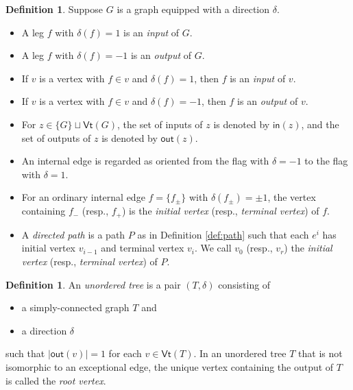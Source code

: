 \documentclass[11pt]{amsbook}
\numberwithin{section}{chapter}
\numberwithin{subsection}{section}
\numberwithin{equation}{section}
\theoremstyle{plain}
\theoremstyle{definition}
\newtheorem{definition}[equation]{Definition}
\newcommand{\Vt}{\mathsf{Vt}}
\newcommand{\inp}{\mathsf{in}}
\newcommand{\out}{\mathsf{out}}
\begin{document}
\begin{definition}\label{def:directed-path} 
Suppose $G$ is a graph equipped with a direction $\delta$.
\begin{itemize} \item A leg $f$ with $\delta(f) = 1$ is an \emph{input} of $G$.
\item A leg $f$ with $\delta(f) = -1$ is an  \emph{output} of $G$.
\item If $v$ is a vertex with $f \in v$ and $\delta(f) = 1$, then $f$ is an \emph{input} of $v$.
\item If $v$ is a vertex with $f \in v$ and $\delta(f) = -1$, then $f$ is an \emph{output} of $v$.
\item For $z \in \{G\} \sqcup \Vt(G)$, the set of inputs of $z$ is denoted by $\inp(z)$, and the set of outputs of $z$ is denoted by $\out(z)$.
\item An internal edge is regarded as oriented from the flag with $\delta=-1$ to the flag with $\delta=1$.
\item For an ordinary internal edge $f=\{f_{\pm}\}$ with $\delta(f_{\pm})=\pm 1$, the vertex containing $f_-$ (resp., $f_+$) is the \emph{initial vertex} (resp., \emph{terminal vertex}) of $f$.
\item A \emph{directed path} is a path $P$ as in Definition \ref{def:path} such that each $e^i$ has initial vertex $v_{i-1}$ and terminal vertex $v_i$.  We call $v_0$ (resp., $v_r$) the \emph{initial vertex} (resp., \emph{terminal vertex}) of $P$.
\end{itemize}\end{definition}

\begin{definition}\label{def:unordered-tree}
An \emph{unordered tree} is a pair $(T,\delta)$ consisting of
\begin{itemize}\item a simply-connected graph $T$ and 
\item a direction $\delta$ 
\end{itemize}
such that $|\out(v)|=1$ for each $v \in \Vt(T)$.  In an unordered tree $T$ that is not isomorphic to an exceptional edge, the unique vertex containing the output of $T$ is called the \emph{root vertex}.
\end{definition}
\end{document}
